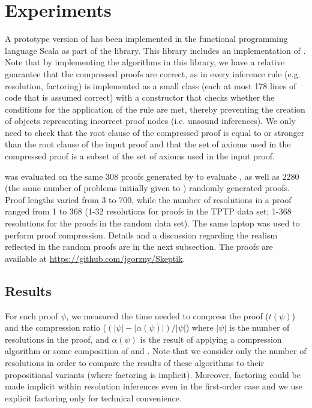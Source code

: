 \section{Experiments} \label{sec:exp}

A prototype version of {\FORPI} has been implemented in the functional programming language Scala as part of the \skeptik
library. This library includes an implementation of {\GFOLU} \cite{GFOLU}. 
Note that by implementing the algorithms in this library, we have a relative guarantee that the compressed proofs are correct, as in \skeptik every inference rule (e.g. resolution, factoring) is implemented as a small class (each at most 178 lines of code that is assumed correct) with a constructor that checks whether the conditions for the application of the rule are met, thereby preventing the creation of objects representing incorrect proof nodes (i.e. unsound inferences). We only need to check that the root clause of the compressed proof is equal to or stronger than the root clause of the input proof and that the set of axioms used in the compressed proof is a subset of the set of axioms used in the input proof.


{\FORPI} was evaluated on the same 308 proofs generated by {\SPASS} to evaluate {\GFOLU}, as well as 2280 (the same number of problems initially given to {\SPASS}) randomly generated proofs. Proof lengths varied from 3 to 700, while the number of resolutions in a proof ranged from 1 to 368 (1-32 resolutions for proofs in the TPTP data set; 1-368 resolutions for the proofs in the random data set). The same laptop was used to perform proof compression. Details and a discussion regarding the realism reflected in the random proofs are in the next subsection.
The proofs are available at \url{https://github.com/jgorzny/Skeptik}.





\subsection{Results}

For each proof $\psi$, we measured the time needed to compress the proof ($t(\psi)$) and the compression ratio ($(|\psi|-|\alpha(\psi)|)/|\psi|$) where $|\psi|$ is the number of resolutions in the proof, and $\alpha(\psi)$ is the result of applying a compression algorithm or some composition of {\FORPI} and {\GFOLU}. Note that we consider only the number of resolutions in order to compare the results of these algorithms to their propositional variants (where factoring is implicit). Moreover, factoring could be made implicit within resolution inferences even in the first-order case and we use explicit factoring only for technical convenience.





